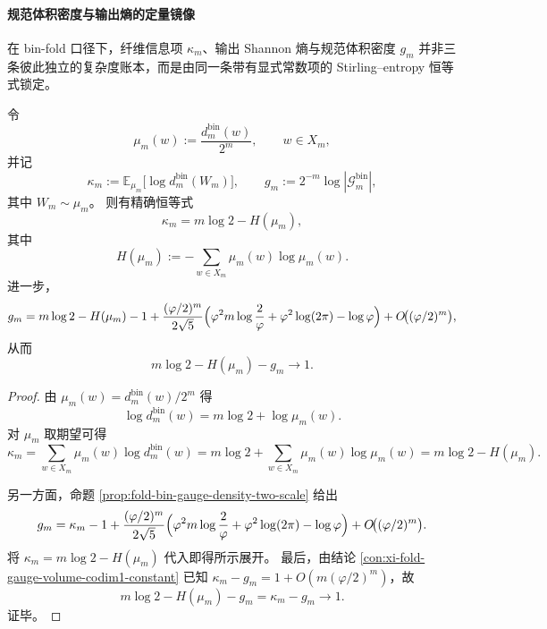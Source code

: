 \paragraph{规范体积密度与输出熵的定量镜像}
在 bin-fold 口径下，纤维信息项 \(\kappa_m\)、输出 Shannon 熵与规范体积密度 \(g_m\) 并非三条彼此独立的复杂度账本，而是由同一条带有显式常数项的 Stirling--entropy 恒等式锁定。

\begin{theorem}\label{thm:xi-foldbin-gauge-entropy-one-nat-law}
令
\[
\mu_m(w):=\frac{d_m^{\mathrm{bin}}(w)}{2^m},
\qquad
w\in X_m,
\]
并记
\[
\kappa_m:=\mathbb E_{\mu_m}\!\bigl[\log d_m^{\mathrm{bin}}(W_m)\bigr],
\qquad
g_m:=2^{-m}\log|\mathcal G_m^{\mathrm{bin}}|,
\]
其中 \(W_m\sim \mu_m\)。
则有精确恒等式
\[
\kappa_m=m\log 2-H(\mu_m),
\]
其中
\[
H(\mu_m):=-\sum_{w\in X_m}\mu_m(w)\log\mu_m(w).
\]
进一步，
\[
g_m
=
m\log 2-H(\mu_m)-1
+\frac{(\varphi/2)^m}{2\sqrt5}
\Bigl(
\varphi^2 m\log\frac{2}{\varphi}
+\varphi^2\log(2\pi)-\log\varphi
\Bigr)
+O\!\bigl((\varphi/2)^m\bigr),
\]
从而
\[
m\log 2-H(\mu_m)-g_m\longrightarrow 1.
\]
\end{theorem}
\begin{proof}
由 \(\mu_m(w)=d_m^{\mathrm{bin}}(w)/2^m\) 得
\[
\log d_m^{\mathrm{bin}}(w)=m\log 2+\log\mu_m(w).
\]
对 \(\mu_m\) 取期望可得
\[
\kappa_m
=
\sum_{w\in X_m}\mu_m(w)\log d_m^{\mathrm{bin}}(w)
=
m\log 2+\sum_{w\in X_m}\mu_m(w)\log\mu_m(w)
=
m\log 2-H(\mu_m).
\]

另一方面，命题 \ref{prop:fold-bin-gauge-density-two-scale} 给出
\[
g_m=\kappa_m-1
+\frac{(\varphi/2)^m}{2\sqrt5}
\Bigl(
\varphi^2 m\log\frac{2}{\varphi}
+\varphi^2\log(2\pi)-\log\varphi
\Bigr)
+O\!\bigl((\varphi/2)^m\bigr).
\]
将 \(\kappa_m=m\log 2-H(\mu_m)\) 代入即得所示展开。
最后，由结论 \ref{con:xi-fold-gauge-volume-codim1-constant} 已知
\(
\kappa_m-g_m=1+O(m(\varphi/2)^m)
\)，故
\[
m\log 2-H(\mu_m)-g_m
=
\kappa_m-g_m
\longrightarrow 1.
\]
证毕。
\end{proof}

